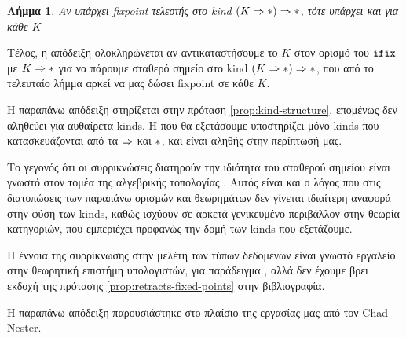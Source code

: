     \newtheorem{corollary}{Λήμμα}
    \begin{corollary}
    Αν υπάρχει fixpoint τελεστής στο kind $(K \Rightarrow \operatorname{\ast}) \Rightarrow \operatorname{\ast}$, τότε υπάρχει
    και για κάθε $K$
    \end{corollary}


Τέλος, η απόδειξη ολοκληρώνεται αν αντικαταστήσουμε το $K$ στον ορισμό του $\operatorname{\texttt{ifix}}$ με
$K \Rightarrow \operatorname{\ast}$ για να πάρουμε σταθερό σημείο στο kind $(K \Rightarrow \operatorname{\ast}) \Rightarrow \operatorname{\ast}$,
που από το τελευταίο λήμμα αρκεί να μας δώσει fixpoint σε κάθε $K$.



Η παραπάνω απόδειξη στηρίζεται στην πρόταση \ref{prop:kind-structure},
επομένως δεν αληθεύει για αυθαίρετα kinds. Η \FOMF{} που θα εξετάσουμε
υποστηρίζει μόνο kinds που κατασκευάζονται από τα $\Rightarrow$ και $\operatorname{\ast}$,
και είναι αληθής στην περίπτωσή μας.

Το γεγονός ότι οι συρρικνώσεις διατηρούν την ιδιότητα του σταθερού σημείου είναι γνωστό στον
τομέα της αλγεβρικής τοπολογίας \cite{eilenberg-steenrod}. Αυτός είναι και ο λόγος που στις διατυπώσεις
των παραπάνω ορισμών και θεωρημάτων δεν γίνεται ιδιαίτερη αναφορά στην φύση των kinds, καθώς
ισχύουν σε αρκετά γενικευμένο περιβάλλον στην θεωρία κατηγοριών, που εμπεριέχει προφανώς την
δομή των kinds που εξετάζουμε.

Η έννοια της συρρίκνωσης στην μελέτη των τύπων δεδομένων είναι γνωστό εργαλείο στην θεωρητική
επιστήμη υπολογιστών, για παράδειγμα
 \cite{stirling}, αλλά δεν έχουμε βρει εκδοχή της πρότασης \ref{prop:retracts-fixed-points} στην βιβλιογραφία.

Η παραπάνω απόδειξη παρουσιάστηκε στο πλαίσιο της εργασίας μας από τον Chad Nester.
